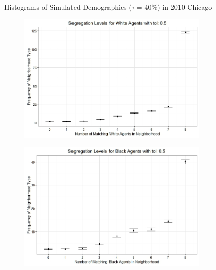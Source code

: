 \begin{figure}[h!]
\begin{subfigure}{.5\textwidth}
\end{subfigure}
\caption[Simulated Demographics ($\tau = 40\%$); 2010 Chicago]{Histograms of Simulated Demographics ($\tau = 40\%$) in 2010 Chicago}
\end{figure}

\begin{figure}[h!]
\centering
\begin{subfigure}{.5\textwidth}
  \centering
\includegraphics[scale=.35]{figures/2010_5_White.jpeg}
\end{subfigure}%
\begin{subfigure}{.5\textwidth}
  \centering
\includegraphics[scale=.35]{figures/2010_5_Black.jpeg}
\end{subfigure}
\hfill \break \hfill \break
\begin{subfigure}{.5\textwidth}
  \centering

\end{subfigure}
\end{figure}
